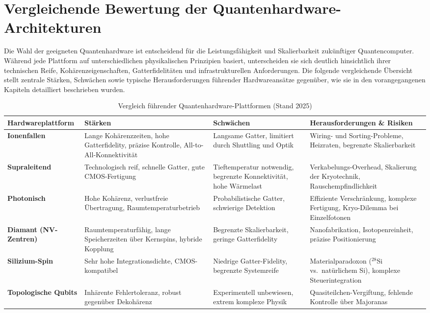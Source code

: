 \section{Vergleichende Bewertung der Quantenhardware-Architekturen}

Die Wahl der geeigneten Quantenhardware ist entscheidend für die Leistungsfähigkeit und Skalierbarkeit zukünftiger Quantencomputer. Während jede Plattform auf unterschiedlichen physikalischen Prinzipien basiert, unterscheiden sie sich deutlich hinsichtlich ihrer technischen Reife, Kohärenzeigenschaften, Gatterfidelitäten und infrastrukturellen Anforderungen. Die folgende vergleichende Übersicht stellt zentrale Stärken, Schwächen sowie typische Herausforderungen führender Hardwareansätze gegenüber, wie sie in den vorangegangenen Kapiteln detailliert beschrieben wurden.

\begin{table}[H]
\centering
\caption{Vergleich führender Quantenhardware-Plattformen (Stand 2025)}
\label{tab:vergleich_hardware}
\begin{tabular}{|p{3.5cm}|p{4cm}|p{4cm}|p{4.5cm}|}
\hline
\textbf{Hardwareplattform} & \textbf{Stärken} & \textbf{Schwächen} & \textbf{Herausforderungen \& Risiken} \\
\hline

\textbf{Ionenfallen} &
Lange Kohärenzzeiten, hohe Gatterfidelity, präzise Kontrolle, All-to-All-Konnektivität &
Langsame Gatter, limitiert durch Shuttling und Optik &
Wiring- und Sorting-Probleme, Heizraten, begrenzte Skalierbarkeit \\

\hline
\textbf{Supraleitend} &
Technologisch reif, schnelle Gatter, gute CMOS-Fertigung &
Tieftemperatur notwendig, begrenzte Konnektivität, hohe Wärmelast &
Verkabelungs-Overhead, Skalierung der Kryotechnik, Rauschempfindlichkeit \\

\hline
\textbf{Photonisch} &
Hohe Kohärenz, verlustfreie Übertragung, Raumtemperaturbetrieb &
Probabilistische Gatter, schwierige Detektion &
Effiziente Verschränkung, komplexe Fertigung, Kryo-Dilemma bei Einzelfotonen \\

\hline
\textbf{Diamant (NV-Zentren)} &
Raumtemperaturfähig, lange Speicherzeiten über Kernspins, hybride Kopplung &
Begrenzte Skalierbarkeit, geringe Gatterfidelity &
Nanofabrikation, Isotopenreinheit, präzise Positionierung \\

\hline
\textbf{Silizium-Spin} &
Sehr hohe Integrationsdichte, CMOS-kompatibel &
Niedrige Gatter-Fidelity, begrenzte Systemreife &
Materialparadoxon ($^{28}$Si vs.\ natürlichem Si), komplexe Steuerintegration \\

\hline
\textbf{Topologische Qubits} &
Inhärente Fehlertoleranz, robust gegenüber Dekohärenz &
Experimentell unbewiesen, extrem komplexe Physik &
Quasiteilchen-Vergiftung, fehlende Kontrolle über Majoranas \\

\hline
\end{tabular}
\end{table}

